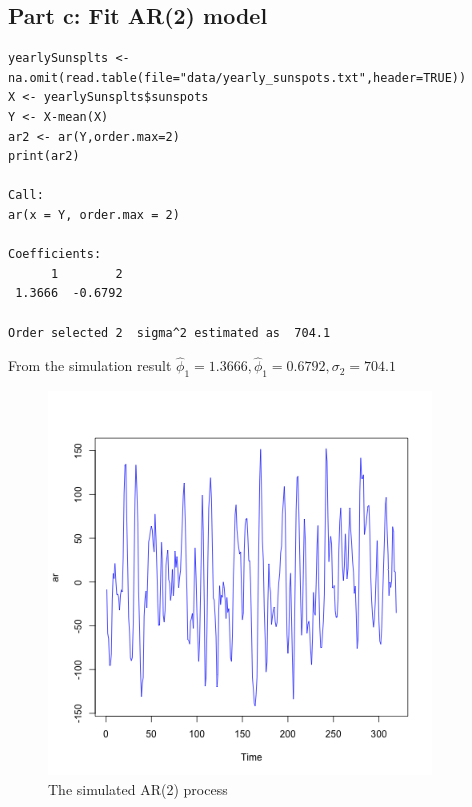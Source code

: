 \documentclass[11pt, oneside]{article}   	%
\begin{document}
 \subsection{Part c: Fit AR(2) model}
 \begin{lstlisting}
yearlySunsplts <- na.omit(read.table(file="data/yearly_sunspots.txt",header=TRUE))
X <- yearlySunsplts$sunspots
Y <- X-mean(X)
ar2 <- ar(Y,order.max=2)
print(ar2)

Call:
ar(x = Y, order.max = 2)

Coefficients:
      1        2  
 1.3666  -0.6792  

Order selected 2  sigma^2 estimated as  704.1
 \end{lstlisting}
 From the simulation result $\hat{\phi}_{1} = 1.3666, \hat{\phi}_{1} =0.6792, \sigma_{2} = 704.1$
 \begin{figure}[H] %
    \centering
    \includegraphics[width=4in]{ar.png} 
    \caption{The simulated AR(2) process}
    \label{fig:ar2}
 \end{figure}
 
\end{document}
